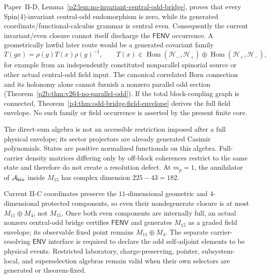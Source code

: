 \documentclass[12pt,a4paper]{article}
\begin{document}
\begin{remark}
\label{p4:rem:covariant-odd-bridge-frontier}
Paper~II-D, Lemma~\ref{p2:lem:no-invariant-central-odd-bridge}, proves that
every Spin(4)-invariant central-odd endomorphism is zero, while its generated
coordinate/functional-calculus grammar is central even.  Consequently the
current invariant/even closure cannot itself discharge the
\(\mathsf{FENV}\) occurrence.  A geometrically lawful later route would be a
generated covariant family
\[
 T(gx)=\rho(g)T(x)\rho(g)^{-1},
 \qquad T(x)\in\operatorname{Hom}(\mathcal H_-,\mathcal H_+)
 \oplus\operatorname{Hom}(\mathcal H_+,\mathcal H_-),
\]
for example from an independently constituted nonparallel spinorial
source or other actual central-odd field input.  The canonical correlated
Born connection and its holonomy alone cannot furnish a nonzero parallel
odd section (Theorem~\ref{p2b:thm:v264-no-parallel-odd}).
If the total block-coupling graph is connected,
Theorem~\ref{p4:thm:odd-bridge-field-envelope} derives the full field
envelope.  No such family or field occurrence is asserted by the present
finite core.
\end{remark}


\begin{remark}
\label{p4:rem:finite-resolution-selection-status}
The direct-sum algebra is not an accessible restriction imposed after a full
physical envelope; its sector projectors are already generated Casimir
polynomials.  States are positive normalized functionals on this algebra.
Full-carrier density matrices differing only by off-block coherences restrict
to the same state and therefore do not create a resolution defect.  At
\(m_p=1\), the annihilator of \(\mathcal A_{\rm kin}\) inside \(M_{15}\) has
complex dimension \(225-43=182\).

Current II-C coordinates preserve the \(11\)-dimensional geometric and
\(4\)-dimensional protected components, so even their nondegenerate closure is
at most \(M_{11}\oplus M_4\), not \(M_{15}\).  Once both even components are
internally full, an actual nonzero central-odd bridge certifies
\(\mathsf{FENV}\) and generates \(M_{15}\) as a graded field envelope; its
observable fixed point remains \(M_{11}\oplus M_4\).  The separate
carrier-resolving \(\mathsf{ENV}\) interface is required to declare the odd
self-adjoint elements to be physical events.
Restricted laboratory, charge-preserving, pointer, subsystem-local, and
superselection algebras remain valid when their own selectors are generated
or theorem-fixed.
\end{remark}
\end{document}
